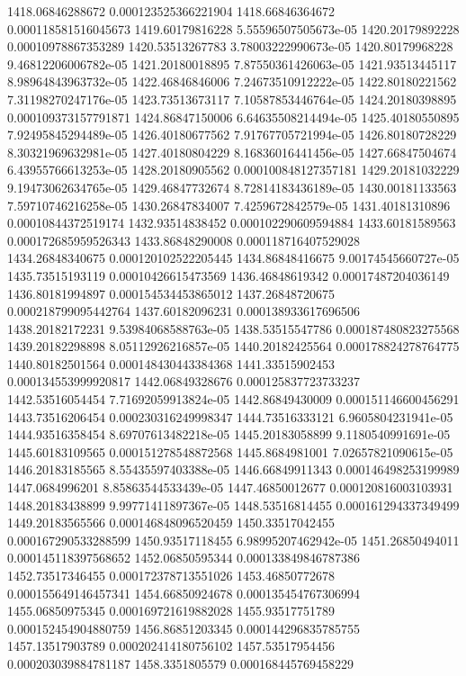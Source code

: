 {1418.06846288672 0.000123525366221904
1418.66846364672 0.000118581516045673
1419.60179816228 5.55596507505673e-05
1420.20179892228 0.00010978867353289
1420.53513267783 3.78003222990673e-05
1420.80179968228 9.46812206006782e-05
1421.20180018895 7.87550361426063e-05
1421.93513445117 8.98964843963732e-05
1422.46846846006 7.24673510912222e-05
1422.80180221562 7.31198270247176e-05
1423.73513673117 7.10587853446764e-05
1424.20180398895 0.000109373157791871
1424.86847150006 6.64635508214494e-05
1425.40180550895 7.92495845294489e-05
1426.40180677562 7.91767705721994e-05
1426.80180728229 8.30321969632981e-05
1427.40180804229 8.16836016441456e-05
1427.66847504674 6.43955766613253e-05
1428.20180905562 0.000100848127357181
1429.20181032229 9.19473062634765e-05
1429.46847732674 8.72814183436189e-05
1430.00181133563 7.59710746216258e-05
1430.26847834007 7.4259672842579e-05
1431.40181310896 0.00010844372519174
1432.93514838452 0.000102290609594884
1433.60181589563 0.000172685959526343
1433.86848290008 0.000118716407529028
1434.26848340675 0.000120102522205445
1434.86848416675 9.00174545660727e-05
1435.73515193119 0.00010426615473569
1436.46848619342 0.00017487204036149
1436.80181994897 0.000154534453865012
1437.26848720675 0.000218799095442764
1437.60182096231 0.000138933617696506
1438.20182172231 9.53984068588763e-05
1438.53515547786 0.000187480823275568
1439.20182298898 8.05112926216857e-05
1440.20182425564 0.000178824278764775
1440.80182501564 0.000148430443384368
1441.33515902453 0.000134553999920817
1442.06849328676 0.000125837723733237
1442.53516054454 7.71692059913824e-05
1442.86849430009 0.000151146600456291
1443.73516206454 0.000230316249998347
1444.73516333121 6.9605804231941e-05
1444.93516358454 8.69707613482218e-05
1445.20183058899 9.1180540991691e-05
1445.60183109565 0.000151278548872568
1445.8684981001 7.02657821090615e-05
1446.20183185565 8.55435597403388e-05
1446.66849911343 0.000146498253199989
1447.0684996201 8.85863544533439e-05
1447.46850012677 0.000120816003103931
1448.20183438899 9.99771411897367e-05
1448.53516814455 0.000161294337349499
1449.20183565566 0.000146848096520459
1450.33517042455 0.000167290533288599
1450.93517118455 6.98995207462942e-05
1451.26850494011 0.000145118397568652
1452.06850595344 0.000133849846787386
1452.73517346455 0.000172378713551026
1453.46850772678 0.000155649146457341
1454.66850924678 0.000135454767306994
1455.06850975345 0.000169721619882028
1455.93517751789 0.000152454904880759
1456.86851203345 0.000144296835785755
1457.13517903789 0.000202414180756102
1457.53517954456 0.000203039884781187
1458.3351805579 0.000168445769458229
}
